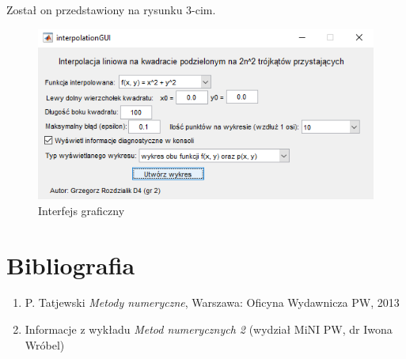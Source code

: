 \documentclass[12pt]{article}
\begin{document}
	Został on przedstawiony na rysunku 3-cim.
	
	\begin{figure}
		\centering
		\includegraphics[scale=1]{images/gui.png}
		\caption{Interfejs graficzny}
	\end{figure}
	
	\pagebreak
	
	\section{Bibliografia}
	\begin{enumerate}
		\item P. Tatjewski \textit{Metody numeryczne}, Warszawa: Oficyna Wydawnicza PW, 2013
		\item Informacje z wykładu \textit{Metod numerycznych 2} (wydział MiNI PW, dr Iwona Wróbel)
	\end{enumerate}
	
\end{document}
